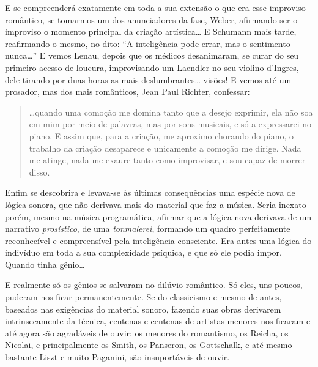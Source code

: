 E se compreenderá exatamente em toda a sua extensão o que era esse
improviso romântico, se tomarmos um dos anunciadores da fase, Weber,
afirmando ser o improviso o momento principal da criação artística\ldots{} E
Schumann mais tarde, reafirmando o mesmo, no dito: ``A inteligência pode
errar, mas o sentimento nunca\ldots{}'' E vemos Lenau, depois que os médicos
desanimaram, se curar do seu primeiro acesso de loucura, improvisando um
Laendler no seu violino d'Ingres, dele tirando por duas horas as mais
deslumbrantes\ldots{} visões! E vemos até um prosador, mas dos mais
românticos, Jean Paul Richter, confessar:

\begin{quote}
\ldots{}quando uma comoção me domina tanto que a desejo exprimir, ela não soa
em mim por meio de palavras, mas por sons musicais, e só a expressarei
no piano. E assim que, para a criação, me aproximo chorando do piano, o
trabalho da criação desaparece e unicamente a comoção me dirige. Nada me
atinge, nada me exaure tanto como improvisar, e sou capaz de morrer
disso.
\end{quote}

Enfim se descobrira e levava-se às últimas consequências uma espécie
nova de lógica sonora, que não derivava mais do material que faz a
música. Seria inexato porém, mesmo na música programática, afirmar que a
lógica nova derivava de um narrativo \textit{prosístico}, de uma \textit{tonmalerei},
formando um quadro perfeitamente reconhecível e compreensível pela
inteligência consciente. Era antes uma lógica do indivíduo em toda a sua
complexidade psíquica, e que só ele podia impor. Quando tinha gênio\ldots{}

E realmente só os gênios se salvaram no dilúvio romântico. Só eles, uns
poucos, puderam nos ficar permanentemente. Se do classicismo e mesmo de
antes, baseados nas exigências do material sonoro, fazendo suas obras
derivarem intrinsecamente da técnica, centenas e centenas de artistas
menores nos ficaram e até agora são agradáveis de ouvir: os menores do
romantismo, os Reicha, os Nicolai, e principalmente os Smith, os
Panseron, os Gottschalk, e até mesmo bastante Liszt e muito Paganini,
são insuportáveis de ouvir.

